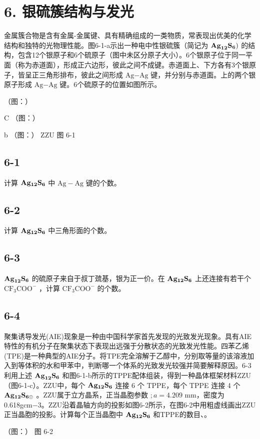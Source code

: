 \section*{6. 银硫簇结构与发光}
⾦属簇合物是含有⾦属-⾦属键、具有精确组成的⼀类物质，常表现出优美的化学结构和独特的光物理性能。图6-1-a⽰出⼀种电中性银硫簇（简记为 $\bf { A g } _ { 1 2 } \bf { S } _ { 6 } )$ 的结构，包含12个银原⼦和6个硫原⼦（图中未区分原⼦⼤⼩）。6个银原⼦位于同⼀平⾯（称为⾚道⾯），形成正六边形，彼此之间不成键。⾚道⾯上、下⽅各有3个银原⼦，皆呈正三⻆形排布，彼此之间形成 $\mathrm { A g \mathrm { - } A g }$ 键，并分别与⾚道⾯。上的两个银原⼦形成 $\mathrm { A g \mathrm { - } A g }$ 键。6个硫原⼦的位置如图所⽰。

（图：）

C
（图：）

b
（图：）
ZZU
图 6-1

\subsection*{6-1}
计算 $\bf { A g _ { 1 2 } S _ { 6 } }$ 中 $\mathrm { A g { - } A g }$ 键的个数。

\subsection*{6-2}
计算 $\bf { A g _ { 1 2 } S _ { 6 } }$ 中三⻆形⾯的个数。

\subsection*{6-3}
$\bf { A g } _ { 1 2 } S _ { 6 }$ 的硫原⼦来⾃于叔丁巯基，银为正⼀价。在 $\bf { A g _ { 1 2 } S _ { 6 } }$ 上还连接有若⼲个 $\mathrm { C F _ { 3 } C O O ^ { - } }$ ，计算 $\mathrm { C F _ { 3 } C O O ^ { - } }$ 的个数。

\subsection*{6-4}
聚集诱导发光(AIE)现象是⼀种由中国科学家⾸先发现的光致发光现象。具有AIE特性的有机分⼦在聚集状态下表现出远强于分散状态的光致发光性能。四苯⼄烯(TPE)是⼀种典型的AIE分⼦。将TPE完全溶解于⼄醇中，分别取等量的该溶液加⼊到等体积的⽔和甲苯中，判断哪⼀个体系的光致发光较强并简要解释原因。6-3 利⽤上述 $\bf { A g } _ { 1 2 } S _ { 6 }$ 和图6-1-b所⽰的TPPE配体组装，得到⼀种晶体框架材料ZZU（图6-1-c）。ZZU中，每个 $\bf { A g _ { 1 2 } S _ { 6 } }$ 连接 6 个 TPPE，每个 TPPE 连接 4 个 $\bf { A g _ { 1 2 } S _ { 6 \odot } }$ 。ZZU属于⽴⽅晶系，正当晶胞参数 $; a = 4 . 2 0 9$ mm，密度为0.618gcm−3。ZZU沿着晶轴⽅向的投影如图6-2所⽰，在图6-2中⽤粗虚线画出ZZU正当晶胞的投影。计算每个正当晶胞中 $\bf { A g _ { 1 2 } S _ { 6 } }$ 和TPPE的数⽬、。

（图：）
图 6-2
